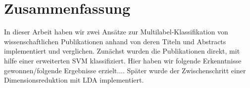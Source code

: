 \section{Zusammenfassung}

In dieser Arbeit haben wir zwei Ansätze zur Multilabel-Klassifikation von wissenschaftlichen Publikationen anhand von deren Titeln und Abstracts implementiert und verglichen.
Zunächst wurden die Publikationen direkt, mit hilfe einer erweiterten SVM klassifiziert.
Hier haben wir folgende Erkenntnisse gewonnen/folgende Ergebnisse erzielt....
Später wurde der Zwischenschritt einer Dimensionsreduktion mit LDA implementiert.

